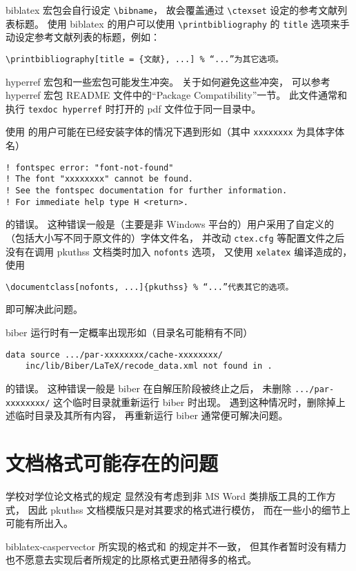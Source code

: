 biblatex\supercite{biblatex} 宏包会自行设定 \verb|\bibname|，
故会覆盖通过 \verb|\ctexset| 设定的参考文献列表标题。
使用 biblatex 的用户可以使用 \verb|\printbibliography| 的
\verb|title| 选项来手动设定参考文献列表的标题，例如：
\begin{Verbatim}
\printbibliography[title = {文献}, ...] % “...”为其它选项。
\end{Verbatim}

hyperref\supercite{hyperref} 宏包和一些宏包可能发生冲突。
关于如何避免这些冲突，
可以参考 hyperref 宏包 README 文件中的“Package Compatibility”一节。
此文件通常和执行 \verb|texdoc hyperref|
时打开的 pdf 文件位于同一目录中。

使用  的用户可能在已经安装字体的情况下遇到形如（其中
\verb|xxxxxxxx| 为具体字体名）
\begin{Verbatim}[fontsize = {\small}]
! fontspec error: "font-not-found"
! The font "xxxxxxxx" cannot be found.
! See the fontspec documentation for further information.
! For immediate help type H <return>.
\end{Verbatim}
的错误。
这种错误一般是（主要是非 Windows 平台的）用户采用了自定义的
（包括大小写不同于原文件的）字体文件名，
并改动 \verb|ctex.cfg| 等配置文件之后没有在调用
pkuthss 文档类时加入 \verb|nofonts| 选项，
又使用 \verb|xelatex| 编译造成的，使用
\begin{Verbatim}
\documentclass[nofonts, ...]{pkuthss} % “...”代表其它的选项。
\end{Verbatim}
即可解决此问题。

biber 运行时有一定概率出现形如（目录名可能稍有不同）
\begin{Verbatim}[fontsize = {\small}]
data source .../par-xxxxxxxx/cache-xxxxxxxx/
	inc/lib/Biber/LaTeX/recode_data.xml not found in .
\end{Verbatim}
的错误。
这种错误一般是 biber 在自解压阶段被终止之后，
未删除 \verb|.../par-xxxxxxxx/| 这个临时目录就重新运行 biber 时出现。
遇到这种情况时，删除掉上述临时目录及其所有内容，
再重新运行 biber 通常便可解决问题。

\section{文档格式可能存在的问题}

学校对学位论文格式的规定\mbox{\supercite{pku-thesisstyle}}%
显然没有考虑到非 MS Word 类排版工具的工作方式，
因此 pkuthss 文档模版只是对其要求的格式进行模仿，
而在一些小的细节上可能有所出入。

biblatex-caspervector\supercite{biblatex-caspervector} 所实现的格式和
\parencite{pku-thesisstyle} 的规定并不一致，
但其作者暂时没有精力也不愿意去实现后者所规定的比原格式更丑陋得多的格式。

